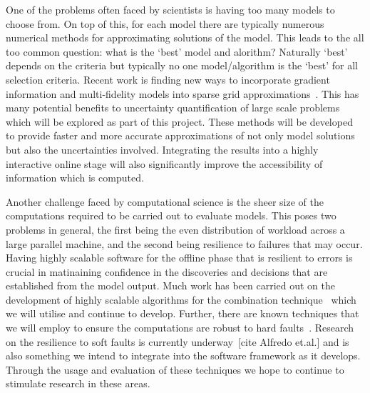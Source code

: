 \documentclass[a4paper,fontsize=12pt]{scrartcl}
\begin{document}
One of the problems often faced by scientists is having too many models 
to choose from. On top of this, for each model there are typically numerous
numerical methods for approximating solutions of the model.
This leads to the all too common question: what is the `best' model and alorithm?
Naturally `best' depends on the criteria but typically no one model/algorithm is
the `best' for all selection criteria.
Recent work is finding new ways to incorporate gradient information and multi-fidelity models into sparse grid approximations~\parencite{deBaarHarding2015,Jakeman2015,deBaarRDM2015}. 
This has many potential benefits to uncertainty quantification of large scale problems which will be explored as part of this project.
These methods will be developed to provide faster and more accurate approximations of not only model solutions but also the uncertainties involved.
Integrating the results into a highly interactive online stage will also significantly improve the accessibility of information which is computed.

Another challenge faced by computational science is the sheer size of the computations required to be carried out to evaluate models. 
This poses two problems in general, the first being the even distribution of workload across a large parallel machine, and the second being resilience to failures that may occur.
Having highly scalable software for the offline phase that is resilient to errors is crucial in matinaining confidence in the discoveries and decisions that are established from the model output.
Much work has been carried out on the development of highly scalable algorithms for the combination technique~\parencite{StrazdinsEtal2015} which we will utilise and continue to develop.
Further, there are known techniques that we will employ to ensure the computations are robust to hard faults~\parencite{HardingHLS2015,AliEtal2015}.
Research on the resilience to soft faults is currently underway~[cite Alfredo et.al.] and is also something we intend to integrate into the software framework as it develops. 
Through the usage and evaluation of these techniques we hope to continue to stimulate research in these areas.
\end{document}

